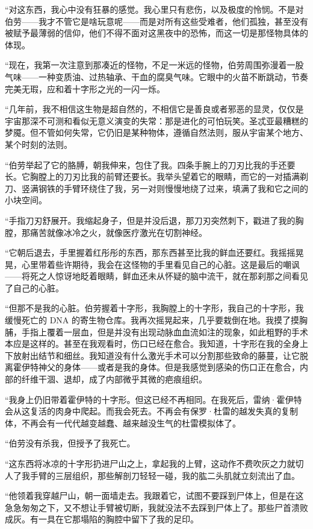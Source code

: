 \documentclass[AutoFakeBold=true]{book}
\begin{document}
``对这东西，我心中没有狂暴的感觉。我心里只有悲伤，以及极度的怜悯。不是对伯劳——我才不管它是啥玩意呢——而是对所有这些受难者，他们孤独，甚至没有被赋予最薄弱的信仰，他们不得不面对这黑夜中的恐怖，而这一切是那怪物具体的体现。

``现在，我第一次注意到那凑近的怪物，不足一米远的怪物，伯劳周围弥漫着一股气味——一种变质油、过热轴承、干血的腐臭气味。它眼中的火苗不断跳动，节奏完美无瑕，应和着十字形之光的一闪一烁。

``几年前，我不相信这生物是超自然的，不相信它是善良或者邪恶的显灵，仅仅是宇宙那深不可测和看似无意义演变的失常：那是进化的可怕玩笑。圣忒亚最糟糕的梦魇。但不管如何失常，它仍旧是某种物体，遵循自然法则，服从宇宙某个地方、某个时刻的法则。

``伯劳举起了它的胳膊，朝我伸来，包住了我。四条手腕上的刀刃比我的手还要长。它胸膛上的刀刃比我的前臂还要长。我举头望着它的眼睛，而它的一对插满剃刀、竖满钢铁的手臂环绕住了我，另一对则慢慢地绕了过来，填满了我和它之间的小块空间。

``手指刀刃舒展开。我缩起身子，但是并没后退，那刀刃突然刺下，戳进了我的胸膛，那痛苦就像冰冷之火，就像医疗激光在切割神经。

``它朝后退去，手里握着红彤彤的东西，那东西甚至比我的鲜血还要红。我摇摇晃晃，心里带着些许期待，我会在这怪物的手里看见自己的心脏。这是最后的嘲讽——将死之人惊讶地眨着眼睛，鲜血还未从怀疑的脑中流干，就在那刹那之间看见了自己的心脏。

``但那不是我的心脏。伯劳握着十字形，我胸膛上的十字形，我自己的十字形，我缓慢死亡的 DNA 的寄生物仓库。我再次摇晃起来，几乎要栽倒在地。我摸了摸胸脯，手指上覆着一层血，但是并没有出现动脉血血流如注的现象，如此粗野的手术本应是这样的。甚至在我观看时，伤口已经在愈合。我知道，十字形在我的全身上下放射出结节和细丝。我知道没有什么激光手术可以分割那些致命的藤蔓，让它脱离霍伊特神父的身体——或者是我的身体。但是我感觉到感染的伤口正在愈合，内部的纤维干涸、退却，成了内部微乎其微的疤痕组织。

``我身上仍旧带着霍伊特的十字形。但这已经不再相同。在我死后，雷纳·霍伊特会从这复活的肉身中爬起。而我会死去。不再会有保罗·杜雷的越发失真的复制体，不再会有一代代越变越蠢、越来越没生气的杜雷模拟体了。

``伯劳没有杀我，但授予了我死亡。

``这东西将冰凉的十字形扔进尸山之上，拿起我的上臂，这动作不费吹灰之力就切人了我手臂的三层组织，那些解剖刀轻轻一碰，我的肱二头肌就立刻流出了血。

``他领着我穿越尸山，朝一面墙走去。我跟着它，试图不要踩到尸体上，但是在这急急匆匆之下，又不想让手臂被切断，我就没法不去踩到尸体上了。那些尸首溃败成灰。有一具在它那塌陷的胸腔中留下了我的足印。
\end{document}

